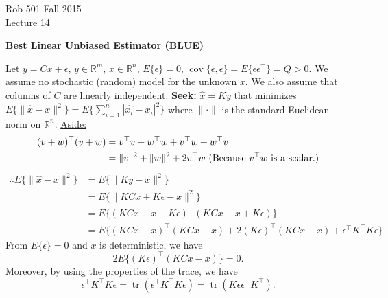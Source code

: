 \documentclass[letterpaper]{article}
\newcommand{\real}{\mathbb R}  %
\begin{document}
\baselineskip=48pt  %


\setlength{\parskip}{.3in}
\setlength{\itemsep}{.3in}

\pagestyle{plain}

{\Large \bf
\begin{center}
Rob 501 Fall 2015\\
Lecture 14
\end{center}
}

\Large

\begin{center}
    \textbf{Best Linear Unbiased Estimator (BLUE)}
\end{center}
    Let $y=Cx+\epsilon$, $y\in \mathbb{R}^m$, $x \in \mathbb{R}^n$, $E\{\epsilon\}=0$, $\operatorname{cov}\{\epsilon,\epsilon\}=E\{\epsilon \epsilon^\top \}=Q>0$.
    \newline
    We assume no stochastic (random) model for the unknown $x$. We also assume that columns of $C$ are linearly independent.
    \newline
    \textbf{Seek:} $\hat{x}=Ky$ that minimizes $E\{\|\hat{x}-x\|^2\}=E\{ \sum \limits_{i=1}^n |\hat{x_i}-x_i|^2\} $ where $\|\cdot \|$ is the standard Euclidean norm on $\real^n$.
    \newline\newline
    \underline{Aside:}~
    \begin{align*}
        (v+w)^\top (v+w)&=v^\top v+w^\top w+v^\top w+w^\top v\\
        &=\|v\|^2+\|w\|^2+2v^\top w\textnormal{ (Because } v^\top w \textnormal{ is a scalar.)}
    \end{align*}
    \begin{align*}
        \therefore E\{\|\hat{x}-x\|^2\}&=E\{\|Ky-x\|^2\}\\
        &= E\{\|KCx+K\epsilon-x\|^2\}\\
        & =E\{(KCx-x+K\epsilon)^\top (KCx-x+K\epsilon)\}\\
        & =E\{(KCx-x)^\top(KCx-x)+2(K\epsilon)^\top(KCx-x)+\epsilon^\top  K^\top  K \epsilon\}
    \end{align*}
    From $E\{\epsilon\}=0$ and $x$ is deterministic, we have
    \begin{equation*}
        2E\{(K\epsilon)^\top(KCx-x)\}=0.
    \end{equation*}
    Moreover, by using the properties of the trace, we have
    \begin{equation*}
        \epsilon^\top K^\top K\epsilon= \operatorname{tr}\left( \epsilon^\top K^\top K\epsilon \right)=\operatorname{tr}\left(K\epsilon\epsilon^\top K^\top\right).
    \end{equation*}
\end{document}
